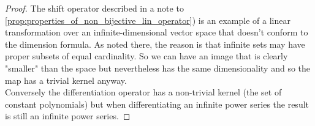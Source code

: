 \documentclass[MathsNotesBase.tex]{subfiles}
\begin{document}
{	
	\begin{proof}
		The shift operator described in a note to \autoref{prop:properties_of_non_bijective_lin_operator}) is an example of a linear transformation over an infinite-dimensional vector space that doesn't conform to the dimension formula. As noted there, the reason is that infinite sets may have proper subsets of equal cardinality. So we can have an image that is clearly "smaller" than the space but nevertheless has the same dimensionality and so the map has a trivial kernel anyway.\\
		Conversely the differentiation operator has a non-trivial kernel (the set of constant polynomials) but when differentiating an infinite power series the result is still an infinite power series.
	\end{proof}

	\bigskip{}
}



\end{document}
